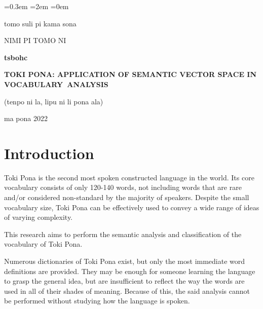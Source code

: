 \documentclass[14pt, a4paper]{extreport}
\begin{document}
\sloppy
{}\font=0.3em %
\font=2em %
\font=0em %

\begin{titlepage}
  \begin{center}
    tomo suli pi kama sona

    NIMI PI TOMO NI

    \vfill

    \textbf{tsbohc}

    \large
    \textbf{TOKI PONA: APPLICATION OF SEMANTIC VECTOR SPACE IN VOCABULARY~ANALYSIS}

    \normalsize

    \bigskip
    (tenpo ni la, lipu ni li pona ala) 

    \bigskip


    \vfill
    ma pona 2022

  \end{center}
\end{titlepage}

\setcounter{page}{2}
\restoregeometry

\renewcommand{\contentsname}{\let\clearpage\relax\chapter*{Contents}} %
\tableofcontents




\chapter{Introduction}

Toki Pona is the second most spoken constructed language in the world. Its core vocabulary consists of only 120-140 words, not including words that are rare and/or considered non-standard by the majority of speakers. Despite the small vocabulary size, Toki Pona can be effectively used to convey a wide range of ideas of varying complexity.

This research aims to perform the semantic analysis and classification of the vocabulary of Toki Pona.

Numerous dictionaries of Toki Pona exist, but only the most immediate word definitions are provided. They may be enough for someone learning the language to grasp the general idea, but are insufficient to reflect the way the words are used in all of their shades of meaning. Because of this, the said analysis cannot be performed without studying how the language is spoken.
\end{document}
